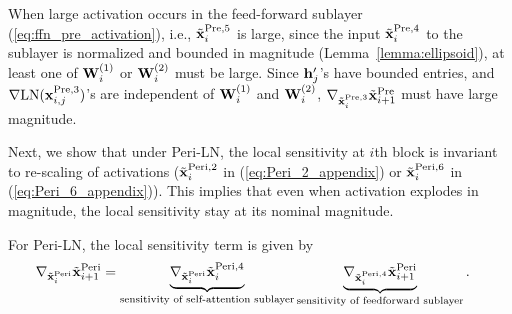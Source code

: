 \documentclass[journal]{IEEEtran}
\newcommand{\bfW}{{\bf W}}
\newcommand{\bfh}{{\bf h}}
\newcommand{\bfx}{{\bf x}}
\theoremstyle{plain}
\theoremstyle{definition}
\theoremstyle{remark}
\begin{document}
When large activation occurs in the feed-forward sublayer (\ref{eq:ffn_pre_activation}),  i.e., $\tilde{\bfx}^{\rm Pre, 5}_i$ is large, since the input $\tilde{\bfx}^{\rm Pre, 4}_i$ to the sublayer is normalized and bounded in magnitude (Lemma~\ref{lemma:ellipsoid}), at least one of $\bfW_{i}^{(1)}$ or $\bfW_{i}^{(2)}$ must be large. Since $\bfh'_j$'s have bounded entries, and $\nabla {\rm LN}(\bfx^{{\rm Pre}, 3}_{i, j})$'s are independent of $\bfW_{i}^{(1)}$ and $\bfW_{i}^{(2)}$, $\nabla_{\tilde{\bfx}_i^{{\rm Pre}, 3}} \tilde{\bfx}_{i+1}^{{\rm Pre}}$ must have large magnitude.

Next, we show that under Peri-LN, the local sensitivity at $i$th block is invariant to re-scaling of activations ($\tilde{\bfx}_i^{{\rm Peri}, 2}$ in (\ref{eq:Peri_2_appendix}) or $\tilde{\bfx}_i^{{\rm Peri}, 6}$ in (\ref{eq:Peri_6_appendix})). This implies that even when activation explodes in magnitude, the local sensitivity stay at its nominal magnitude.


For Peri-LN, the local sensitivity term is given by 
\begin{align}
    \nabla_{\tilde{\bfx}_{i}^{\rm Peri}} \tilde{\bfx}_{i+1}^{\rm Peri} &= \underbrace{\nabla_{\tilde{\bfx}_i^{{\rm Peri}}} \tilde{\bfx}_i^{{\rm Peri}, 4}}_{\text{sensitivity of self-attention sublayer}}  \underbrace{\nabla_{\tilde{\bfx}_i^{{\rm Peri}, 4}} \tilde{\bfx}_{i+1}^{{\rm Peri}}}_{\text{sensitivity of feedforward sublayer}}.
\end{align}
\end{document}
